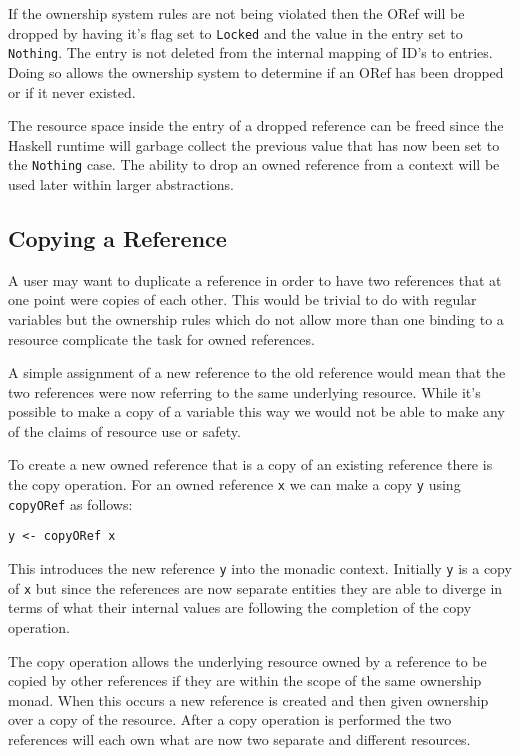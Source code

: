 \documentclass[onehalf,11pt]{beavtex}
\begin{document}
If the ownership system rules are not being violated then the ORef will be
dropped by having it's flag set to \texttt{Locked} and the value in the
entry set to \texttt{Nothing}.
The entry is not deleted from the internal mapping of
ID's to entries. Doing so allows the ownership system to determine if an ORef
has been dropped or if it never existed.

The resource space inside the entry of a dropped reference can be freed since
the Haskell runtime will garbage collect the previous value that has now been
set to the \texttt{Nothing} case.
The ability to drop an owned reference from a context will be used later
within larger abstractions.


\subsection{Copying a Reference}

A user may want to duplicate a reference in order to have two references
that at one point were copies of each other.
This would be trivial to do with regular variables but the ownership rules
which do not allow more than one binding to a resource complicate the task for
owned references.

A simple assignment of a new reference to the old reference would mean that
the two references were now referring to the same underlying resource. While
it's possible to make a copy of a variable this way we would not be able to
make any of the claims of resource use or safety.

To create a new owned reference that is a copy of an existing reference
there is the copy operation. For an owned reference \texttt{x} we can make
a copy \texttt{y} using \texttt{copyORef} as follows:

\begin{verbatim}
y <- copyORef x
\end{verbatim}

This introduces the new reference \texttt{y} into the monadic context. Initially
\texttt{y} is a copy of \texttt{x} but since the references are now separate
entities they are able to diverge in terms of what their internal
values are following the completion of the copy operation.


The copy operation allows the underlying resource owned by a reference to be
copied by other references if they are within the scope of the same ownership
monad.
When this occurs a new reference is created and then given ownership over a
copy of the resource.
After a copy operation is performed the two references will each own what are
now two separate and different resources.
\end{document}
